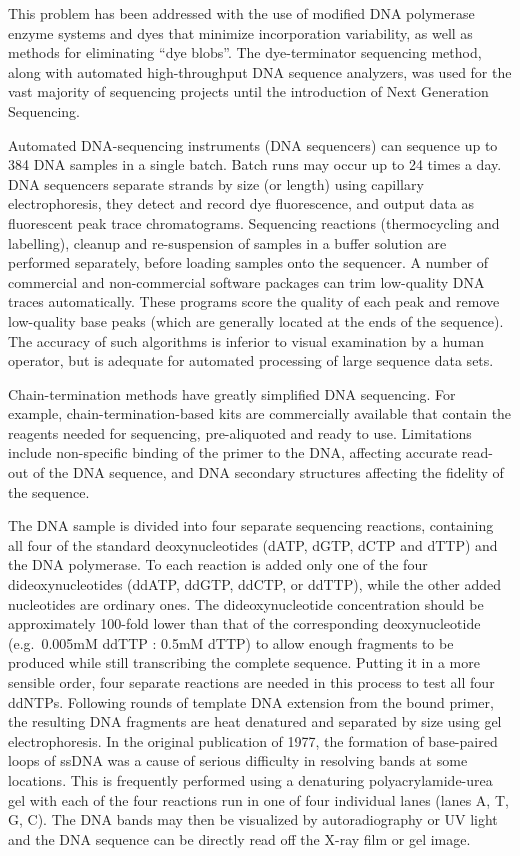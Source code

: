 This problem has been addressed with the use of modified DNA polymerase enzyme systems and dyes that minimize incorporation variability, as well as methods for eliminating ``dye blobs''. The dye-terminator sequencing method, along with automated high-throughput DNA sequence analyzers, was used for the vast majority of sequencing projects until the introduction of Next Generation Sequencing.

Automated DNA-sequencing instruments (DNA sequencers) can sequence up to 384 DNA samples in a single batch. Batch runs may occur up to 24 times a day. DNA sequencers separate strands by size (or length) using capillary electrophoresis, they detect and record dye fluorescence, and output data as fluorescent peak trace chromatograms. Sequencing reactions (thermocycling and labelling), cleanup and re-suspension of samples in a buffer solution are performed separately, before loading samples onto the sequencer. A number of commercial and non-commercial software packages can trim low-quality DNA traces automatically. These programs score the quality of each peak and remove low-quality base peaks (which are generally located at the ends of the sequence). The accuracy of such algorithms is inferior to visual examination by a human operator, but is adequate for automated processing of large sequence data sets.

Chain-termination methods have greatly simplified DNA sequencing. For example, chain-termination-based kits are commercially available that contain the reagents needed for sequencing, pre-aliquoted and ready to use. Limitations include non-specific binding of the primer to the DNA, affecting accurate read-out of the DNA sequence, and DNA secondary structures affecting the fidelity of the sequence.

The DNA sample is divided into four separate sequencing reactions, containing all four of the standard deoxynucleotides (dATP, dGTP, dCTP and dTTP) and the DNA polymerase. To each reaction is added only one of the four dideoxynucleotides (ddATP, ddGTP, ddCTP, or ddTTP), while the other added nucleotides are ordinary ones. The dideoxynucleotide concentration should be approximately 100-fold lower than that of the corresponding deoxynucleotide (e.g.~0.005mM ddTTP : 0.5mM dTTP) to allow enough fragments to be produced while still transcribing the complete sequence. Putting it in a more sensible order, four separate reactions are needed in this process to test all four ddNTPs. Following rounds of template DNA extension from the bound primer, the resulting DNA fragments are heat denatured and separated by size using gel electrophoresis. In the original publication of 1977, the formation of base-paired loops of ssDNA was a cause of serious difficulty in resolving bands at some locations. This is frequently performed using a denaturing polyacrylamide-urea gel with each of the four reactions run in one of four individual lanes (lanes A, T, G, C). The DNA bands may then be visualized by autoradiography or UV light and the DNA sequence can be directly read off the X-ray film or gel image.


